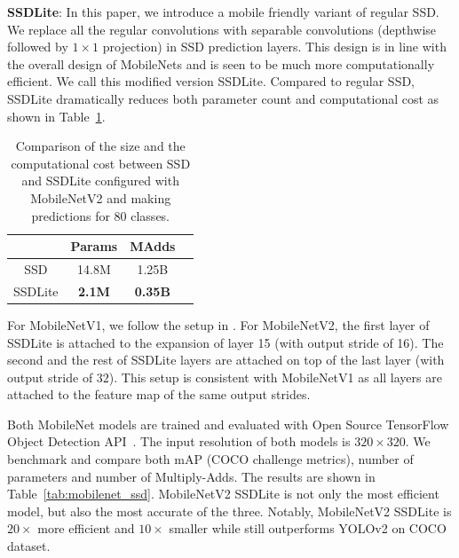 \documentclass[10pt,twocolumn,letterpaper]{article}
\begin{document}
\textbf{SSDLite}: In this paper, we introduce a mobile friendly variant of regular SSD. We replace all the regular convolutions with separable convolutions (depthwise followed by $1\times1$ projection) in SSD prediction layers.
This design is in line with the overall design of \mbox{MobileNets} and is seen to be much more computationally efficient.
We call this modified version \mbox{SSDLite}.
Compared to regular SSD, \mbox{SSDLite} dramatically reduces both parameter count and computational cost as shown in Table~\ref{tab:ssd_lite}.

\begin{table}[!t]
  \centering
  \begin{tabular}{c | c c c}
  \toprule[0.2em]
   & Params & MAdds \\
  \toprule[0.2em]
  SSD\cite{liu2016ssd} & 14.8M &  1.25B  \\
  SSDLite & \textbf{2.1M} & \textbf{0.35B}  \\
  \toprule[0.2em]
  \end{tabular}
  \caption{
    Comparison of the size and the computational cost between SSD and SSDLite configured with \mbox{MobileNetV2} and making predictions for $80$ classes.}
  \label{tab:ssd_lite}
\end{table}

For \mbox{MobileNetV1}, we follow the setup in \cite{huang2016speed}.
For \mbox{MobileNetV2}, the first layer of SSDLite is attached to the  expansion of layer 15 (with output stride of 16). The second and the rest of SSDLite layers are attached on top of the last layer (with output stride of $32$). This setup is consistent with \mbox{MobileNetV1} as all  layers are attached to the  feature map of the same output strides.

Both \mbox{MobileNet} models are trained and evaluated with Open Source TensorFlow Object Detection API~\cite{detection-api}.
The input resolution of both models is $320\times 320$.
We benchmark and compare both mAP (COCO challenge metrics), number of parameters and number of Multiply-Adds.
The results are shown in Table~\ref{tab:mobilenet_ssd}.
\mbox{MobileNetV2} SSDLite is not only the most efficient model, but also the most accurate of the three.
Notably, \mbox{MobileNetV2} SSDLite is \textbf{$20\times$} more efficient and \textbf{$10\times$} smaller while still outperforms YOLOv2 on COCO dataset.
\end{document}
